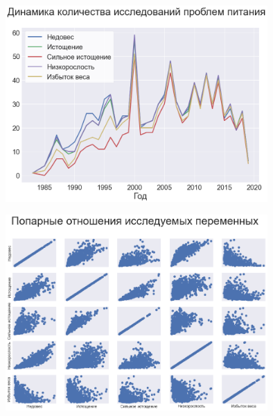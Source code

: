 \documentclass{beamer}
\begin{document}
\begin{frame}

\begin{figure}
	\centering
	\includegraphics[width=100mm]{2.png}
\end{figure}


\end{frame}



\begin{frame}

\begin{figure}
	\centering
	\includegraphics[width=100mm]{3.png}
\end{figure}


\end{frame}
\end{document}
